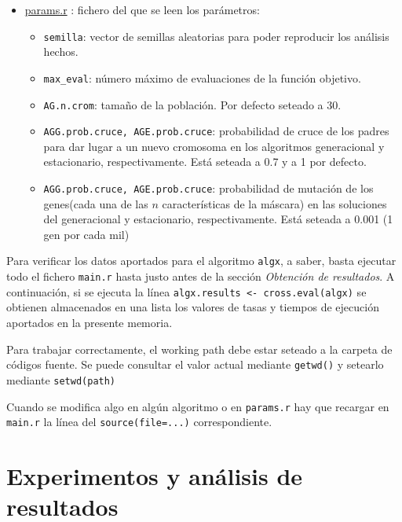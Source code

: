 \documentclass[a4paper,11pt]{article}
\newcommand{\hrefr}[1]{
\href{../bin/#1}{#1}
}
\begin{document}
\begin{itemize}
 \item \hrefr{params.r}: fichero del que se leen los parámetros:
  \begin{itemize}
    \item \texttt{semilla}: vector de semillas aleatorias para poder reproducir los análisis hechos.
    \item \texttt{max\_eval}: número máximo de evaluaciones de la función objetivo.
    \item \texttt{AG.n.crom}: tamaño de la población. Por defecto seteado a 30.
    \item \texttt{AGG.prob.cruce, AGE.prob.cruce}: probabilidad de cruce de los padres para dar lugar a un nuevo cromosoma 
    en los algoritmos generacional y estacionario, respectivamente. Está seteada a 0.7 y a 1 por defecto.
    \item \texttt{AGG.prob.cruce, AGE.prob.cruce}: probabilidad de mutación de los genes(cada una de las $n$ características
    de la máscara) en las soluciones del generacional y estacionario, respectivamente. Está seteada a 0.001 (1 gen por cada mil)
  \end{itemize}
 \end{itemize}
 
 Para verificar los datos aportados para el algoritmo \texttt{algx}, a saber, basta ejecutar todo el fichero \texttt{main.r}
 hasta justo antes de la sección \textit{Obtención de resultados}. A continuación, si se ejecuta la línea 
 \texttt{algx.results <- cross.eval(algx)} se obtienen almacenados en una lista los valores de tasas y tiempos de ejecución
 aportados en la presente memoria. 
 
 Para trabajar correctamente, el working path debe estar seteado a la carpeta de códigos fuente. Se puede consultar el 
 valor actual mediante \texttt{getwd()} y setearlo mediante \texttt{setwd(path)}
 
 Cuando se modifica algo en algún algoritmo o en \texttt{params.r} hay que recargar en \texttt{main.r}
 la línea del \texttt{source(file=...)} correspondiente.
 
 \section{Experimentos y análisis de resultados}
\end{document}
